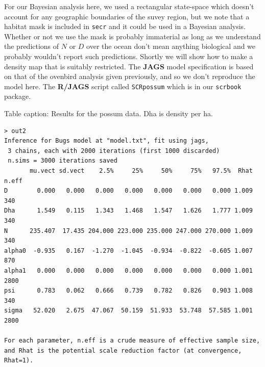 For our Bayesian analysis here, we used a rectangular state-space which
doesn't account for any geographic boundaries of the suvey region, but
we note that a habitat mask is included in {\tt secr} and it could be
used in a Bayesian analysis.
Whether or not we use the mask is
probably immaterial as long as we understand the predictions of $N$ or
$D$ over the ocean don't mean anything biological and we probably
wouldn't report such predictions. Shortly we will show how to make a
density map that is suitably restricted. The {\bf JAGS} model
specification is based on that of the ovenbird analysis given
previously, and so we don't reproduce the model here. The {\bf R/JAGS}
script called \mbox{\tt SCRpossum} which is in our \mbox{\tt scrbook}
package. 


{\small

Table caption: Results for the possum data. Dha is density per ha.
\begin{verbatim}
> out2
Inference for Bugs model at "model.txt", fit using jags,
 3 chains, each with 2000 iterations (first 1000 discarded)
 n.sims = 3000 iterations saved
       mu.vect sd.vect    2.5%     25%     50%     75%   97.5%  Rhat n.eff
D        0.000   0.000   0.000   0.000   0.000   0.000   0.000 1.009   340
Dha      1.549   0.115   1.343   1.468   1.547   1.626   1.777 1.009   340
N      235.407  17.435 204.000 223.000 235.000 247.000 270.000 1.009   340
alpha0  -0.935   0.167  -1.270  -1.045  -0.934  -0.822  -0.605 1.007   870
alpha1   0.000   0.000   0.000   0.000   0.000   0.000   0.000 1.001  2800
psi      0.783   0.062   0.666   0.739   0.782   0.826   0.903 1.008   340
sigma   52.020   2.675  47.067  50.159  51.933  53.748  57.585 1.001  2800

For each parameter, n.eff is a crude measure of effective sample size,
and Rhat is the potential scale reduction factor (at convergence, Rhat=1).
\end{verbatim}
}


